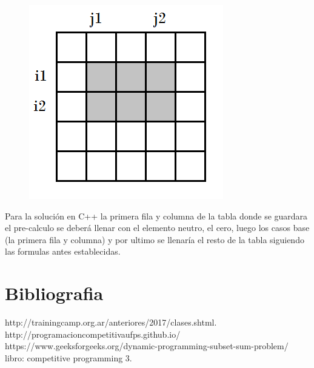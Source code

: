 \documentclass[12pt, a4paper]{article}
\newcommand\cppfile[2][]{

}
\begin{document}
\begin{figure}[!htb]
			\caption{}%
		\endminipage
			\centering
			\includegraphics[scale=0.4]{imagenes/img4}
			\caption{}
		\endminipage
	\end{figure}
	
	Para la solución en C++ la primera fila y columna de la tabla donde se guardara el pre-calculo se deberá llenar
	con el elemento neutro, el cero, luego los casos base (la primera fila y columna) y por ultimo se llenaría el
	resto de la tabla siguiendo las formulas antes establecidas.
	\cppfile[26-42]{codigos/tablas_aditivas.cpp}
	
	\section{Bibliografia}
	
	http://trainingcamp.org.ar/anteriores/2017/clases.shtml.\\
	http://programacioncompetitivaufps.github.io/\\
	https://www.geeksforgeeks.org/dynamic-programming-subset-sum-problem/\\
	libro: competitive programming 3.\\
\end{document}
